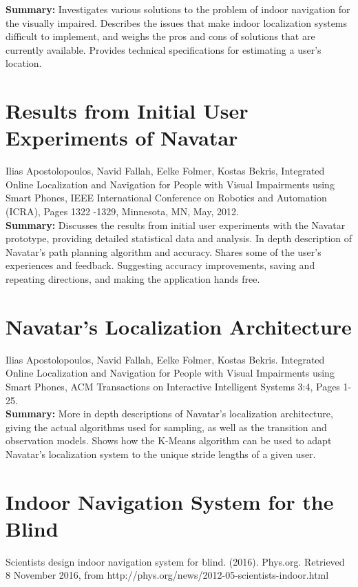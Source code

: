 \documentclass{scrreprt}
\begin{document}
 \textbf{Summary:}
 Investigates various solutions to the problem of indoor navigation for the visually impaired. Describes the issues that make indoor localization systems difficult to implement, and weighs the pros and cons of solutions that are currently available. Provides technical specifications for estimating a user’s location.
 
\section{Results from Initial User Experiments of Navatar}
Ilias Apostolopoulos, Navid Fallah, Eelke Folmer, Kostas Bekris, Integrated Online Localization and Navigation for People with Visual Impairments using Smart Phones, IEEE International Conference on Robotics and Automation (ICRA), Pages 1322 -1329, Minnesota, MN, May, 2012.\\

\textbf{Summary:}
Discusses the results from initial user experiments with the Navatar prototype, providing detailed statistical data and analysis. In depth description of Navatar’s path planning algorithm and accuracy. Shares some of the user’s experiences and feedback. Suggesting accuracy improvements, saving and repeating directions, and making the application hands free.

\section{Navatar’s Localization Architecture}
 Ilias Apostolopoulos, Navid Fallah, Eelke Folmer, Kostas Bekris. Integrated Online Localization and Navigation for People with Visual Impairments using Smart Phones, ACM Transactions on Interactive Intelligent Systems 3:4, Pages 1-25.\\

\textbf{Summary:}
More in depth descriptions of Navatar’s localization architecture, giving the actual algorithms used for sampling, as well as the transition and observation models. Shows how the K-Means algorithm can be used to adapt Navatar’s localization system to the unique stride lengths of a given user.

\section{Indoor Navigation System for the Blind}
Scientists design indoor navigation system for blind. (2016). Phys.org. Retrieved 8 November 2016, from http://phys.org/news/2012-05-scientists-indoor.html\\
\end{document}

